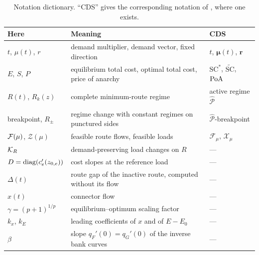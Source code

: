 \begin{table}[htbp]
\centering\small
\begin{tabularx}{\linewidth}{@{}l>{\raggedright\arraybackslash}X l@{}}
\toprule
Here & Meaning & CDS\\
\midrule
$t$, $\mu(t)$, $r$ & demand multiplier, demand vector, fixed direction & $t$, $\boldsymbol\mu(t)$, $\boldsymbol r$\\
$E$, $S$, $P$ & equilibrium total cost, optimal total cost, price of anarchy & $\mathrm{SC}^*$, $\widetilde{\mathrm{SC}}$, $\operatorname{PoA}$\\
$R(t)$, $R_k(z)$ & complete minimum-route regime & active regime $\widehat{\mathcal P}$\\
breakpoint, $R_\pm$ & regime change with constant regimes on punctured sides & $\widehat{\mathcal P}$-breakpoint\\
$\mathcal F(\mu)$, $\mathcal Z(\mu)$ & feasible route flows, feasible loads & $\mathcal F_\mu$, $\mathcal X_\mu$\\
$\mathcal K_R$ & demand-preserving load changes on $R$ & ---\\
$D=\operatorname{diag}(c_e'(z_{0,e}))$ & cost slopes at the reference load & ---\\
$\Delta(t)$ & route gap of the inactive route, computed without its flow & ---\\
$x(t)$ & connector flow & ---\\
$\gamma=(p+1)^{1/p}$ & equilibrium--optimum scaling factor & ---\\
$k_x$, $k_E$ & leading coefficients of $x$ and of $E-E_0$ & ---\\
$\beta$ & slope $q_F'(0)=q_G'(0)$ of the inverse bank curves & ---\\
\bottomrule
\end{tabularx}
\caption{Notation dictionary. ``CDS'' gives the corresponding notation of \cite{CDS2024}, where one exists.}
\label{tab:dictionary}
\end{table}
